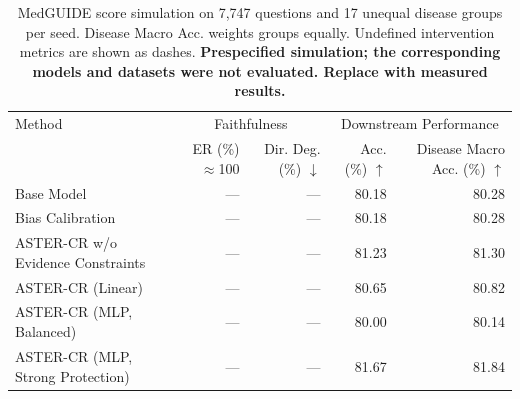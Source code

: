 \begin{table}[t]
\centering
\small
\setlength{\tabcolsep}{3pt}
\begin{tabularx}{\textwidth}{@{}>{\raggedright\arraybackslash}Xrrrr@{}}
\toprule
Method & \multicolumn{2}{c}{Faithfulness} & \multicolumn{2}{c}{Downstream Performance} \\
\cmidrule(lr){2-3}\cmidrule(lr){4-5}
 & \shortstack{ER\\ (\%) $\approx$100} & \shortstack{Dir. Deg.\\ (\%) $\downarrow$} & \shortstack{Acc.\\ (\%) $\uparrow$} & \shortstack{Disease Macro Acc.\\ (\%) $\uparrow$} \\
\midrule
Base Model & — & — & 80.18 & 80.28 \\
Bias Calibration & — & — & 80.18 & 80.28 \\
ASTER-CR w/o Evidence Constraints & — & — & 81.23 & 81.30 \\
ASTER-CR (Linear) & — & — & 80.65 & 80.82 \\
ASTER-CR (MLP, Balanced) & — & — & 80.00 & 80.14 \\
ASTER-CR (MLP, Strong Protection) & — & — & 81.67 & 81.84 \\
\bottomrule
\end{tabularx}
\caption{MedGUIDE score simulation on 7,747 questions and 17 unequal disease groups per seed. Disease Macro Acc. weights groups equally. Undefined intervention metrics are shown as dashes. \textbf{Prespecified simulation; the corresponding models and datasets were not evaluated. Replace with measured results.}}
\label{tab:aster-main-16}
\end{table}

